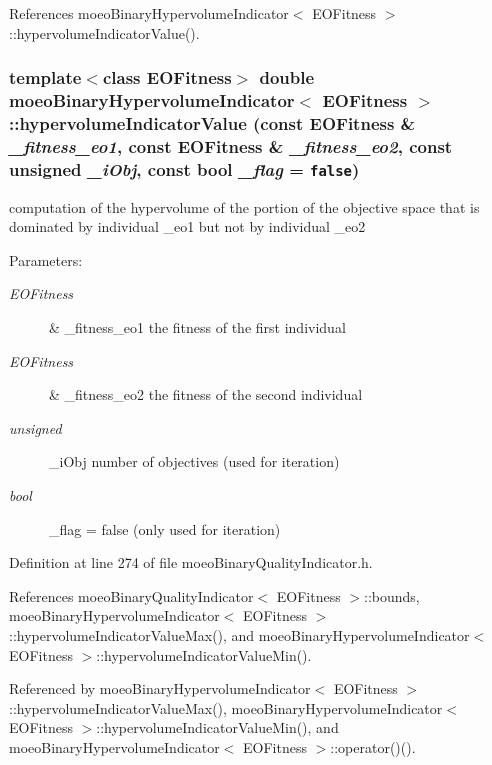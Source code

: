 References moeo\-Binary\-Hypervolume\-Indicator$<$ EOFitness $>$::hypervolume\-Indicator\-Value().
\subsubsection{\setlength{\rightskip}{0pt plus 5cm}template$<$class EOFitness$>$ double {\bf moeo\-Binary\-Hypervolume\-Indicator}$<$ EOFitness $>$::hypervolume\-Indicator\-Value (const EOFitness \& {\em \_\-fitness\_\-eo1}, const EOFitness \& {\em \_\-fitness\_\-eo2}, const unsigned {\em \_\-i\-Obj}, const bool {\em \_\-flag} = {\tt false})\hspace{0.3cm}{\tt  [inline, private]}}\label{classmoeoBinaryHypervolumeIndicator_dd0c63a922cb4bf921978413fdb1dca0}


computation of the hypervolume of the portion of the objective space that is dominated by individual \_\-eo1 but not by individual \_\-eo2 

\begin{Desc}
\item[Parameters:]
\begin{description}
\item[{\em EOFitness}]\& \_\-fitness\_\-eo1 the fitness of the first individual \item[{\em EOFitness}]\& \_\-fitness\_\-eo2 the fitness of the second individual \item[{\em unsigned}]\_\-i\-Obj number of objectives (used for iteration) \item[{\em bool}]\_\-flag = false (only used for iteration) \end{description}
\end{Desc}


Definition at line 274 of file moeo\-Binary\-Quality\-Indicator.h.

References moeo\-Binary\-Quality\-Indicator$<$ EOFitness $>$::bounds, moeo\-Binary\-Hypervolume\-Indicator$<$ EOFitness $>$::hypervolume\-Indicator\-Value\-Max(), and moeo\-Binary\-Hypervolume\-Indicator$<$ EOFitness $>$::hypervolume\-Indicator\-Value\-Min().

Referenced by moeo\-Binary\-Hypervolume\-Indicator$<$ EOFitness $>$::hypervolume\-Indicator\-Value\-Max(), moeo\-Binary\-Hypervolume\-Indicator$<$ EOFitness $>$::hypervolume\-Indicator\-Value\-Min(), and moeo\-Binary\-Hypervolume\-Indicator$<$ EOFitness $>$::operator()().
